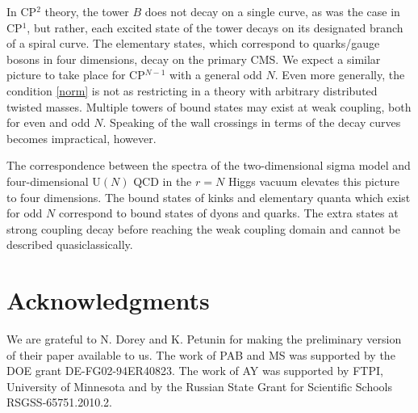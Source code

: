 \documentclass[epsfig,12pt]{article}
\begin{document}
	In CP$^2$ theory, the tower $ B $ does not decay on a single curve, as was the case in CP$^1$, but rather, 
	each excited state of the tower decays on its designated branch of a spiral curve. 
	The elementary states, which correspond to quarks/gauge bosons in four dimensions, decay on the primary CMS.
	We expect a similar picture to take place for CP$^{N-1}$ with a general odd $ N $.
	Even more generally, the condition \eqref{norm} is not as restricting in a theory with arbitrary distributed 
	twisted masses.
	Multiple towers of bound states may exist at weak coupling, both for even and odd $ N $.
	Speaking of the wall crossings in terms of the decay curves becomes impractical, however.

	The correspondence between the spectra of the two-dimensional sigma model and four-dimensional U$(N)$ QCD
	in the $r=N$  Higgs vacuum elevates this picture to four dimensions.
	The bound states of kinks and elementary quanta which exist for odd $ N $ correspond to 
	bound states of dyons and quarks.
	The extra states at strong coupling decay before reaching the weak coupling domain and 
	cannot be described quasiclassically.

	

\section*{Acknowledgments}
We are grateful to N. Dorey and K. Petunin for making the preliminary version of their paper \cite{ndkp}
available to us.
The work of PAB and MS was supported by the DOE grant DE-FG02-94ER40823.
The work of AY was  supported
by  FTPI, University of Minnesota
and by the Russian State Grant for
Scientific Schools RSGSS-65751.2010.2.
	
	
\end{document}
